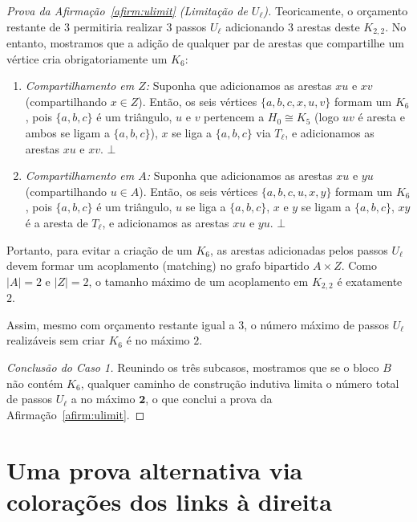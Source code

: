\documentclass[reqno, 12pt]{amsart}
\numberwithin{equation}{section}
\theoremstyle{plain}
\theoremstyle{definition}
\begin{document}
\begin{proof}[Prova da Afirmação~\ref{afirm:ulimit} (Limitação de $U_\ell$)]
    Teoricamente, o orçamento restante de $3$ permitiria realizar $3$ passos $U_\ell$ adicionando $3$ arestas
    deste $K_{2,2}$. No entanto, mostramos que a adição de qualquer par de arestas que compartilhe um vértice
    cria obrigatoriamente um $K_6$:
    \begin{enumerate}
        \item \emph{Compartilhamento em $Z$:} Suponha que adicionamos as arestas $xu$ e $xv$ (compartilhando $x \in Z$).
              Então, os seis vértices $\{a,b,c,x,u,v\}$ formam um $K_6$, pois $\{a,b,c\}$ é um triângulo,
              $u$ e $v$ pertencem a $H_0 \cong K_5$ (logo $uv$ é aresta e ambos se ligam a $\{a,b,c\}$),
              $x$ se liga a $\{a,b,c\}$ via $T_\ell$, e adicionamos as arestas $xu$ e $xv$. $\bot$
        \item \emph{Compartilhamento em $A$:} Suponha que adicionamos as arestas $xu$ e $yu$ (compartilhando $u \in A$).
              Então, os seis vértices $\{a,b,c,u,x,y\}$ formam um $K_6$, pois $\{a,b,c\}$ é um triângulo,
              $u$ se liga a $\{a,b,c\}$, $x$ e $y$ se ligam a $\{a,b,c\}$, $xy$ é a aresta de $T_\ell$,
              e adicionamos as arestas $xu$ e $yu$. $\bot$
    \end{enumerate}
    Portanto, para evitar a criação de um $K_6$, as arestas adicionadas pelos passos $U_\ell$ devem
    formar um acoplamento (matching) no grafo bipartido $A \times Z$. Como $|A| = 2$ e $|Z| = 2$,
    o tamanho máximo de um acoplamento em $K_{2,2}$ é exatamente $2$.

    Assim, mesmo com orçamento restante igual a $3$, o número máximo de passos $U_\ell$ realizáveis
    sem criar $K_6$ é no máximo $2$.

    \medskip
    \noindent\textit{Conclusão do Caso 1.}
    Reunindo os três subcasos, mostramos que se o bloco $B$ não contém $K_6$,
    qualquer caminho de construção indutiva limita o número total de passos $U_\ell$ a no máximo $\mathbf{2}$,
    o que conclui a prova da Afirmação~\ref{afirm:ulimit}.
\end{proof}


\section{Uma prova alternativa via colorações dos links à direita}
\end{document}
